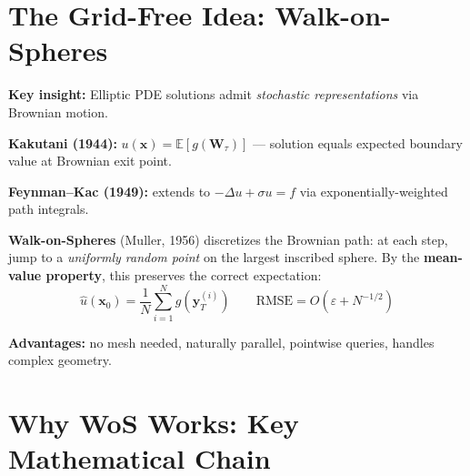 \documentclass[11pt]{article}
\begin{document}
\section{The Grid-Free Idea: Walk-on-Spheres}

\textbf{Key insight:} Elliptic PDE solutions admit \emph{stochastic representations} via Brownian motion.

\textbf{Kakutani (1944):} \; $u(\mathbf{x}) = \mathbb{E}[g(\mathbf{W}_\tau)]$ --- solution equals expected boundary value at Brownian exit point.

\textbf{Feynman--Kac (1949):} extends to $-\Delta u + \sigma u = f$ via exponentially-weighted path integrals.

\textbf{Walk-on-Spheres} (Muller, 1956) discretizes the Brownian path: at each step, jump to a \emph{uniformly random point} on the largest inscribed sphere. By the \textbf{mean-value property}, this preserves the correct expectation:
\[
  \widehat{u}(\mathbf{x}_0)
  = \frac{1}{N}\sum_{i=1}^{N}
  g\!\left(\mathbf{y}^{(i)}_T\right)
  \qquad
  \text{RMSE} = O\!\left(\varepsilon + N^{-1/2}\right)
\]

\textbf{Advantages:} no mesh needed, naturally parallel, pointwise queries, handles complex geometry.

\section{Why WoS Works: Key Mathematical Chain}
\end{document}
